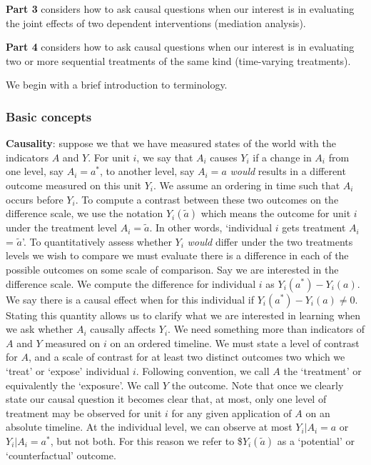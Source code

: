 \documentclass[
  single column]{article}
\begin{document}
\textbf{Part 3} considers how to ask causal questions when our interest
is in evaluating the joint effects of two dependent interventions
(mediation analysis).

\textbf{Part 4} considers how to ask causal questions when our interest
is in evaluating two or more sequential treatments of the same kind
(time-varying treatments).

We begin with a brief introduction to terminology.

\subsubsection{Basic concepts}\label{basic-concepts}

\textbf{Causality}: suppose we that we have measured states of the world
with the indicators \(A\) and \(Y\). For unit \(i\), we say that \(A_i\)
causes \(Y_i\) if a change in \(A_i\) from one level, say \(A_i = a^*\),
to another level, say \(A_i = a\) \emph{would} results in a different
outcome measured on this unit \(Y_i\). We assume an ordering in time
such that \(A_i\) occurs before \(Y_i\). To compute a contrast between
these two outcomes on the difference scale, we use the notation
\(Y_i(\tilde{a})\) which means the outcome for unit \(i\) under the
treatment level \(A_i  = \tilde{a}\). In other words, `individual \(i\)
gets treatment \(A_i\) = \(\tilde{a}\)'. To quantitatively assess
whether \(Y_i\) \emph{would} differ under the two treatments levels we
wish to compare we must evaluate there is a difference in each of the
possible outcomes on some scale of comparison. Say we are interested in
the difference scale. We compute the difference for individual \(i\) as
\(Y_i(a^*) - Y_i(a)\). We say there is a causal effect when for this
individual if \(Y_i(a^*) - Y_i(a) \neq 0\). Stating this quantity allows
us to clarify what we are interested in learning when we ask whether
\(A_i\) causally affects \(Y_i\). We need something more than indicators
of \(A\) and \(Y\) measured on \(i\) on an ordered timeline. We must
state a level of contrast for \(A\), and a scale of contrast for at
least two distinct outcomes two which we `treat' or `expose' individual
\(i\). Following convention, we call \(A\) the `treatment' or
equivalently the `exposure'. We call \(Y\) the outcome. Note that once
we clearly state our causal question it becomes clear that, at most,
only one level of treatment may be observed for unit \(i\) for any given
application of \(A\) on an absolute timeline. At the individual level,
we can observe at most \(Y_i|A_i =a\) or \(Y_i|A_i =a^*\), but not both.
For this reason we refer to \$\(Y_i(\tilde{a})\) as a `potential' or
`counterfactual' outcome.
\end{document}
